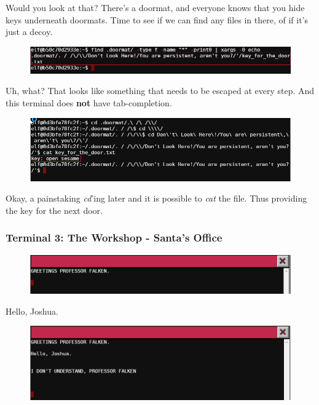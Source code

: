 \documentclass[writeup.tex]{subfiles}
\begin{document}
			Would you look at that? There's a doormat, and everyone knows that you hide keys underneath doormats. Time to see if we can find any files in there, of if it's just a decoy.
			\begin{figure}[H]
				\centering
				\includegraphics[width=\linewidth]{"screenshots/terminals/Terminal 2 - find"}
			\end{figure}
			
			Uh, what? That looks like something that needs to be escaped at every step. And this terminal does \textbf{not} have tab-completion.
			
			\begin{figure}[H]
				\centering
				\includegraphics[width=\linewidth]{"screenshots/terminals/Terminal 2 - cd + cat"}
			\end{figure}
			
			Okay, a painstaking \textit{cd}'ing later and it is possible to \textit{cat} the file. Thus providing the key for the next door.



		\subsubsection{Terminal 3: The Workshop - Santa's Office } \label{terminal3}
			\begin{figure}[H]
				\centering
				\includegraphics[width=\linewidth]{"screenshots/terminals/Terminal 3 - First"}
			\end{figure}
			
			Hello, Joshua.

			\begin{figure}[H]
				\centering
				\includegraphics[width=\linewidth]{"screenshots/terminals/Terminal 3 - I dont understand"}
			\end{figure}
			
\end{document}

